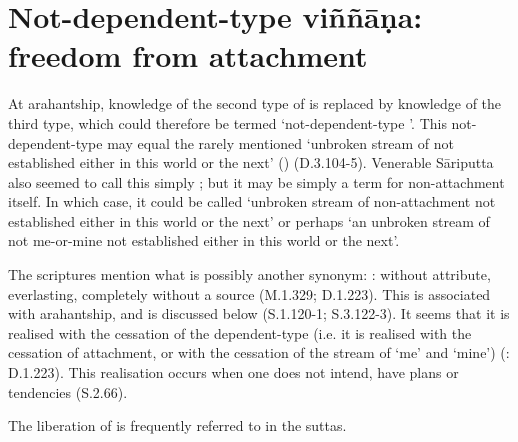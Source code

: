 \section*{Not-dependent-type vi\~n\~n\=a\d{n}a: freedom from attachment}

At arahantship, knowledge of the second type of  is replaced by knowledge of the third type, which could therefore be termed `not-dependent-type '. This not-dependent-type  may equal the rarely mentioned `unbroken stream of  not established either in this world or the next' () (D.3.104-5). Venerable Sāriputta also seemed to call this simply ; but it may be simply a term for non-attachment itself. In which case, it could be called `unbroken stream of non-attachment not established either in this world or the next' or perhaps `an unbroken stream of not me-or-mine not established either in this world or the next'.

The scriptures mention what is possibly another synonym: :  without attribute, everlasting, completely without a source (M.1.329; D.1.223). This is associated with arahantship, and is discussed below (S.1.120-1; S.3.122-3). It seems that it is realised with the cessation of the dependent-type  (i.e. it is realised with the cessation of attachment, or with the cessation of the stream of `me' and `mine') (: D.1.223). This realisation occurs when one does not intend, have plans or tendencies (S.2.66).

The liberation of  is frequently referred to in the suttas.

